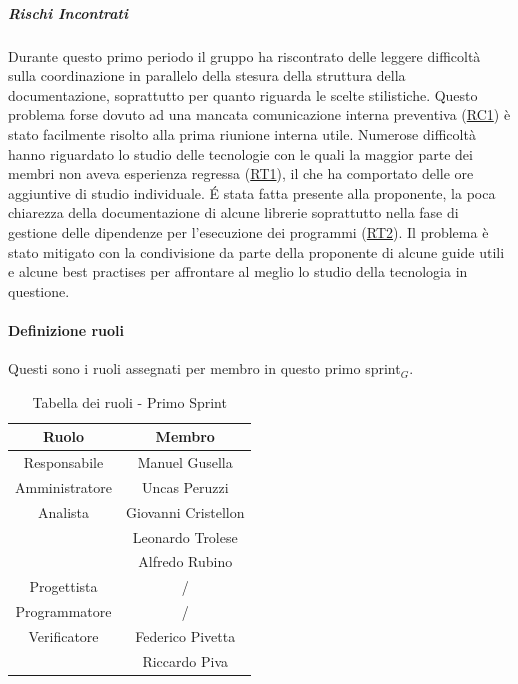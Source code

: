 \documentclass[10pt]{article}
\begin{document}
{{    \subparagraph*{Rischi Incontrati}\mbox{}

    Durante questo primo periodo il gruppo ha riscontrato delle leggere difficoltà sulla coordinazione in parallelo della stesura della struttura della documentazione, soprattutto per quanto riguarda le scelte stilistiche. Questo problema forse dovuto ad una mancata comunicazione interna preventiva (\hyperref[RC1]{RC1}) è stato facilmente risolto alla prima riunione interna utile.\newline
    Numerose difficoltà hanno riguardato lo studio delle tecnologie con le quali la maggior parte dei membri non aveva esperienza regressa (\hyperref[RT1]{RT1}), il che ha comportato delle ore aggiuntive di studio individuale. \'E stata fatta presente alla proponente, la poca chiarezza della documentazione di alcune librerie soprattutto nella fase di gestione delle dipendenze per l'esecuzione dei programmi (\hyperref[RT2]{RT2}). Il problema è stato mitigato con la condivisione da parte della proponente di alcune guide utili e alcune best practises per affrontare al meglio lo studio della tecnologia in questione.

    
    \paragraph{Definizione ruoli}\mbox{}\vspace{0.4em}

    Questi sono i ruoli assegnati per membro in questo primo sprint$_G$.\\
    
    \begin{table}[H]
        \centering
        \begin{tabular}{|c|c|}
        \hline
        \rowcolor{gray!25}
        \textbf{Ruolo} & \textbf{Membro}\\
        \hline
        Responsabile & Manuel Gusella\\
        \hline
        Amministratore & Uncas Peruzzi\\ 
        \hline
        Analista & Giovanni Cristellon\\
        & Leonardo Trolese\\
        & Alfredo Rubino\\
        \hline
        Progettista & / \\
        \hline
        Programmatore & / \\
        \hline
        Verificatore & Federico Pivetta\\
        & Riccardo Piva\\
        \hline
        \end{tabular}
        \caption{Tabella dei ruoli - Primo Sprint}
    \end{table}

}}
\end{document}
